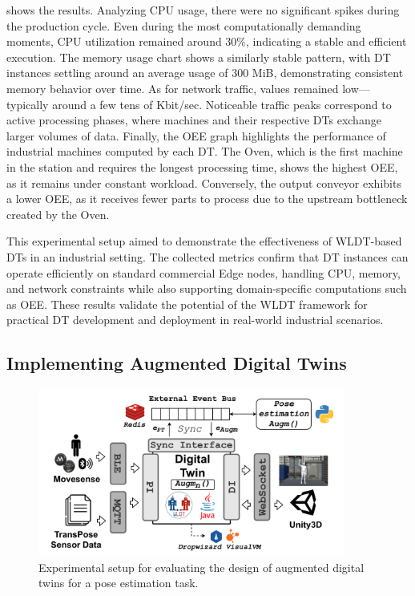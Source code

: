  shows the results.
Analyzing CPU usage, there were no significant spikes during the production cycle.
Even during the most computationally demanding moments, CPU utilization remained around 30\%, indicating a stable and efficient execution.
%
The memory usage chart shows a similarly stable pattern, with DT instances settling around an average usage of 300 MiB, demonstrating consistent memory behavior over time.
As for network traffic, values remained low—typically around a few tens of Kbit/sec.
Noticeable traffic peaks correspond to active processing phases, where machines and their respective DTs exchange larger volumes of data.
%
Finally, the OEE graph highlights the performance of industrial machines computed by each DT. The Oven, which is the first machine in the station and requires the longest processing time, shows the highest OEE, as it remains under constant workload.
%
Conversely, the output conveyor exhibits a lower OEE, as it receives fewer parts to process due to the upstream bottleneck created by the Oven.

This experimental setup aimed to demonstrate the effectiveness of \ac{WLDT}-based DTs in an industrial setting.
The collected metrics confirm that DT instances can operate efficiently on standard commercial Edge nodes, handling CPU, memory, and network constraints while also supporting domain-specific computations such as OEE.
These results validate the potential of the \ac{WLDT} framework for practical DT development and deployment in real-world industrial scenarios.

\subsection{Implementing Augmented Digital Twins}

\begin{figure}
    \centering
    \includegraphics[width=0.9\textwidth]{figures/experimental_evaluation_scheme_new_industry.pdf}
    \caption{Experimental setup for evaluating the design of augmented digital twins for a pose estimation task.}
    \label{fig:augmentation-experimental-setup}
\end{figure}

